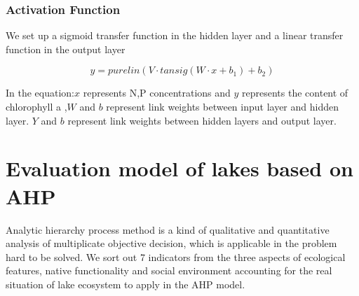 \documentclass[12pt,a4paper]{article}
\begin{document}
\subsubsection{Activation Function}
We set up a sigmoid transfer function in the hidden layer and a linear transfer function in the output layer


\begin{equation}y=purelin(V\cdot tansig(W\cdot x+b_1)+b_2)\end{equation}

In the equation:$x$ represents N,P concentrations and $y$ represents the content of chlorophyll a ,$W$ and $b$ represent link weights between input layer and hidden layer. $Y$ and $b$ represent link weights between hidden layers and output layer. 

\section{Evaluation model of lakes based on AHP}
Analytic hierarchy process method is a kind of qualitative and quantitative analysis of multiplicate objective decision, which is applicable in the problem hard to be solved. We sort out 7 indicators from the three aspects of ecological features, native functionality and social environment accounting for the real situation of lake ecosystem to apply in the AHP model.\par

\end{document}

